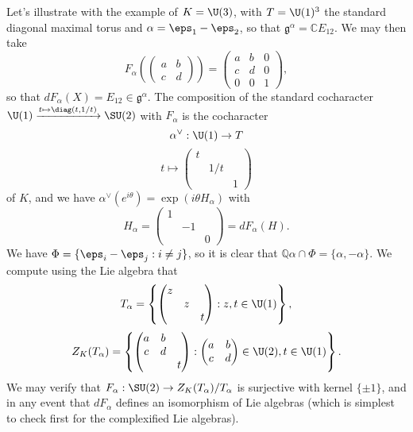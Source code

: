 \documentclass[reqno]{amsart} 
\begin{document}
Let's illustrate with the example of $K = \U(3)$, with $T = \U(1)^3$ the standard diagonal maximal torus and $\alpha = \eps_1 - \eps_2$, so that $\mathfrak{g}^{\alpha} = \mathbb{C} E_{12 }$.  We may then take
\begin{equation*}
  F_\alpha (
\begin{pmatrix}
    a & b \\
    c & d
  \end{pmatrix}
) = 
\begin{pmatrix}
    a & b & 0 \\
    c & d & 0 \\
    0 & 0 & 1
  \end{pmatrix}
,
\end{equation*}
so that $d F_\alpha(X) = E_{12} \in \mathfrak{g}^\alpha$.  The composition of the standard cocharacter $\U(1) \xrightarrow{t \mapsto \diag(t,1/t)} \SU(2)$ with $F_\alpha$ is the cocharacter
\begin{equation*}
  \alpha^\vee : \U(1) \rightarrow T
\end{equation*}
\begin{equation*}
  t \mapsto 
\begin{pmatrix}
    t &  &  \\
    & 1/t &  \\
    & & 1
  \end{pmatrix}
\end{equation*}
of $K$, and we have $\alpha^\vee(e^{i \theta}) = \exp(i \theta H_\alpha)$ with
\begin{equation*}
  H_\alpha = 
\begin{pmatrix}
    1 &  &  \\
    & -1 &  \\
    & & 0
  \end{pmatrix}
  = d F_\alpha(H).
\end{equation*}
We have $\Phi = \{\eps_i - \eps_j : i \neq j\}$, so it is clear that $\mathbb{Q} \alpha \cap \Phi = \{\alpha, - \alpha \}$.  We compute using the Lie algebra that
\begin{equation*}
  T_\alpha = \left\{ 
\begin{pmatrix}
      z &  &  \\
      & z &  \\
      & & t
    \end{pmatrix}
 : z, t \in \U(1) \right\},
\end{equation*}
\begin{equation*}
  Z_K(T_\alpha) = \left\{ 
\begin{pmatrix}
      a & b &  \\
      c & d &  \\
      & & t
    \end{pmatrix}
 : 
\begin{pmatrix}
      a & b \\
      c & d
    \end{pmatrix}
 \in \U(2), t \in \U(1) \right\}.
\end{equation*}
We may verify that $F_\alpha : \SU(2) \rightarrow Z_K(T_\alpha)/T_\alpha$ is surjective with kernel $\{\pm 1\}$, and in any event that $d F_\alpha$ defines an isomorphism of Lie algebras (which is simplest to check first for the complexified Lie algebras).
\end{document}

